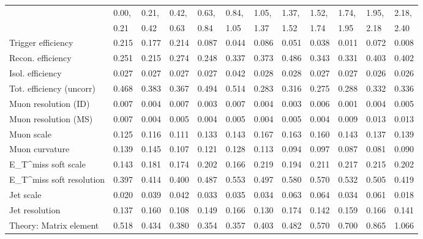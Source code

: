 \begin{tabular}{l|p{0.6cm}p{0.6cm}p{0.6cm}p{0.6cm}p{0.6cm}p{0.6cm}p{0.6cm}p{0.6cm}p{0.6cm}p{0.6cm}p{0.6cm}}
\hline
   & 0.00, & 0.21, & 0.42, & 0.63, & 0.84, & 1.05, & 1.37, & 1.52, & 1.74, & 1.95, & 2.18,  \\ 
   & 0.21 & 0.42 & 0.63 & 0.84 & 1.05 & 1.37 & 1.52 & 1.74 & 1.95 & 2.18 & 2.40  \\ 
\hline
Trigger efficiency                       & 0.215 & 0.177 & 0.214 & 0.087 & 0.044 & 0.086 & 0.051 & 0.038 & 0.011 & 0.072 & 0.008 \\
Recon. efficiency                        & 0.251 & 0.215 & 0.274 & 0.248 & 0.337 & 0.373 & 0.486 & 0.343 & 0.331 & 0.403 & 0.402 \\
Isol. efficiency                         & 0.027 & 0.027 & 0.027 & 0.027 & 0.042 & 0.028 & 0.028 & 0.027 & 0.027 & 0.026 & 0.026 \\
Tot. efficiency (uncorr)                 & 0.468 & 0.383 & 0.367 & 0.494 & 0.514 & 0.283 & 0.316 & 0.275 & 0.288 & 0.332 & 0.336 \\
Muon resolution (ID)                     & 0.007 & 0.004 & 0.007 & 0.003 & 0.007 & 0.004 & 0.003 & 0.006 & 0.001 & 0.004 & 0.005 \\
Muon resolution (MS)                     & 0.007 & 0.004 & 0.005 & 0.004 & 0.005 & 0.004 & 0.005 & 0.004 & 0.009 & 0.013 & 0.013 \\
Muon scale                               & 0.125 & 0.116 & 0.111 & 0.133 & 0.143 & 0.167 & 0.163 & 0.160 & 0.143 & 0.137 & 0.139 \\
Muon curvature                           & 0.139 & 0.145 & 0.107 & 0.121 & 0.128 & 0.113 & 0.094 & 0.097 & 0.087 & 0.081 & 0.090 \\
E_{T}^{miss} soft scale                  & 0.143 & 0.181 & 0.174 & 0.202 & 0.166 & 0.219 & 0.194 & 0.211 & 0.217 & 0.215 & 0.202 \\
E_{T}^{miss} soft resolution             & 0.397 & 0.414 & 0.400 & 0.487 & 0.553 & 0.497 & 0.580 & 0.570 & 0.532 & 0.505 & 0.419 \\
Jet scale                                & 0.020 & 0.039 & 0.042 & 0.033 & 0.035 & 0.034 & 0.063 & 0.064 & 0.034 & 0.061 & 0.018 \\
Jet resolution                           & 0.137 & 0.160 & 0.108 & 0.149 & 0.166 & 0.130 & 0.174 & 0.142 & 0.159 & 0.166 & 0.141 \\
Theory: Matrix element                   & 0.518 & 0.434 & 0.380 & 0.354 & 0.357 & 0.403 & 0.482 & 0.570 & 0.700 & 0.865 & 1.066 \\

\end{tabular}
